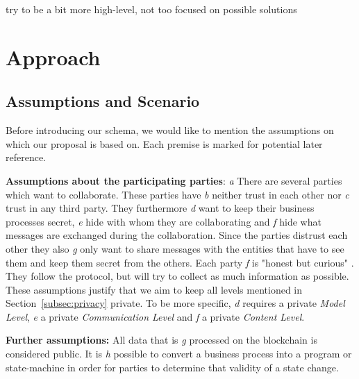 \documentclass[runningheads]{llncs}
\newcommand{\ber}[1]{\textit{#1}}
\newcommand{\refsec}[1]{Section~\ref{#1}}
\begin{document}
try to be a bit more high-level, not too focused on possible solutions










\section{Approach} \label{sec:approach}

\subsection{Assumptions and Scenario} \label{subsec:assumptions}




Before introducing our schema, we would like to mention the assumptions on which our proposal is based on. Each premise is marked for potential later reference. 



\bigbreak
\textbf{Assumptions about the participating parties}: \ber{a} There are several parties which want to collaborate. These parties have \ber{b} neither trust in each other nor \ber{c} trust in any third party. They furthermore \ber{d} want to keep their business processes secret, \ber{e} hide with whom they are collaborating and \ber{f} hide what messages are exchanged during the collaboration. Since the parties distrust each other they also \ber{g} only want to share messages with the entities that have to see them and keep them secret from the others. Each party \ber{f} is "honest but curious" . They follow the protocol, but will try to collect as much information as possible. These assumptions justify that we aim to keep all levels mentioned in \refsec{subsec:privacy}  private. To be more specific, \ber{d} requires a private \ber{Model Level}, \ber{e} a private \ber{Communication Level} and \ber{f} a private  \ber{Content Level}.


\bigbreak
\textbf{Further assumptions:}
All data that is \ber{g} processed on the blockchain is considered public. It is \ber{h} possible to convert a business process into a program or state-machine in order for parties to determine that validity of a state change.
\end{document}
